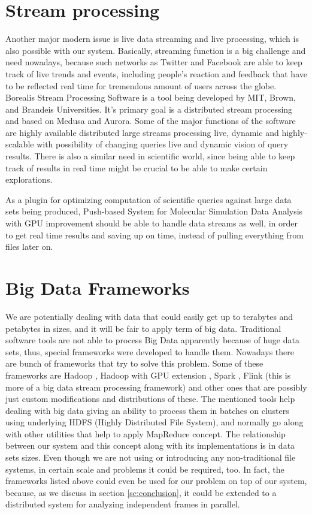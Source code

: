 \documentclass[12pt,letterpaper]{report}
\begin{document}
\section{Stream processing}
\hspace{3em} Another major modern issue is live data streaming and live processing, which is also possible with our system. Basically, streaming function is a big challenge and need nowadays, because such networks as Twitter and Facebook are able to keep track of live trends and events, including people's reaction and feedback that have to be reflected real time for tremendous amount of users across the globe. Borealis Stream Processing Software is a tool being developed by MIT, Brown, and Brandeis Universities. It's primary goal is a distributed stream processing and based on Medusa and Aurora. Some of the major functions of the software are highly available distributed large streams processing live, dynamic and highly-scalable with possibility of changing queries live and dynamic vision of query results. \cite{borealis} There is also a similar need in scientific world, since being able to keep track of results in real time might be crucial to be able to make certain explorations. 

As a plugin for optimizing computation of scientific queries against large data sets being produced, Push-based System for Molecular Simulation Data Analysis with GPU improvement should be able to handle data streams as well, in order to get real time results and saving up on time, instead of pulling everything from files later on.

\section{Big Data Frameworks}

\hspace{3em} We are potentially dealing with data that could easily get up to terabytes and petabytes in sizes, and it will be fair to apply term of big data. Traditional software tools are not able to process Big Data apparently because of huge data sets, thus, special frameworks were developed to handle them. Nowadays there are bunch of frameworks that try to solve this problem. Some of these frameworks are Hadoop \cite{hadoop}, Hadoop with GPU extension \cite{hadoopgpu}, Spark \cite{spark}, Flink \cite{flink} (this is more of a big data stream processing framework) and other ones that are possibly just custom modifications and distributions of these. The mentioned tools help dealing with big data giving an ability to process them in batches on clusters using underlying HDFS (Highly Distributed File System), and normally go along with other utilities that help to apply MapReduce concept. The relationship between our system and this concept along with its implementations is in data sets sizes. Even though we are not using or introducing any non-traditional file systems, in certain scale and problems it could be required, too. In fact, the frameworks listed above could even be used for our problem on top of our system, because, as we discuss in section \ref{sc:conclusion}, it could be extended to a distributed system for analyzing independent frames in parallel. 
\end{document}
